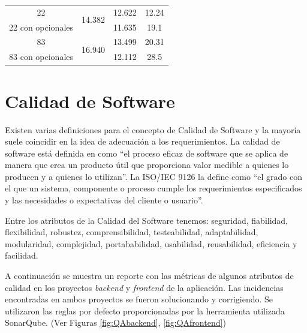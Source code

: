 \begin{table}[tbp]
{\begin{tabular}{cccc}
22                 & \multirow{2}{*}{14.382}                                                           & 12.622                  & 12.24                                                                         \\
22 con opcionales  &                                                                                   & 11.635                  & 19.1                                                                          \\ \hline
83                 & \multirow{2}{*}{16.940}                                                           & 13.499                  & 20.31                                                                         \\
83 con opcionales  &                                                                                   & 12.112                  & 28.5                                                                          \\ \hline
\end{tabular}%
}
\end{table}

\section{Calidad de Software}

Existen varias definiciones para el concepto de Calidad de Software y la mayoría suele coincidir en la idea de adecuación a los requerimientos. La calidad de software está definida en \citet{Pressman2010IngenieriaPractico} como ``el proceso eficaz de software que se aplica de manera que crea un producto útil que proporciona valor medible a quienes lo producen y a quienes lo utilizan''. La ISO/IEC 9126 la define como ``el grado con el que un sistema, componente o proceso cumple los requerimientos especificados y las necesidades o expectativas del cliente o usuario''. 

Entre los atributos de la Calidad del Software tenemos: seguridad, fiabilidad, flexibilidad, robustez, comprensibilidad, testeabilidad, adaptabilidad, modularidad, complejidad, portababilidad, usabilidad, reusabilidad, eficiencia y facilidad.

A continuación se muestra un reporte con las métricas de algunos atributos de calidad en los proyectos \textit{backend} y \textit{frontend} de la aplicación. Las incidencias encontradas en ambos proyectos se fueron solucionando y corrigiendo. Se utilizaron las reglas por defecto proporcionadas por la herramienta utilizada SonarQube. (Ver Figuras \ref{fig:QAbackend}, \ref{fig:QAfrontend})

